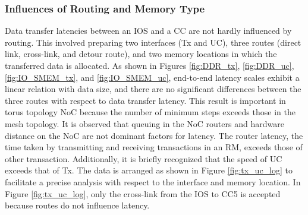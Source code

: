 \documentclass[conference,compsoc]{IEEEtran}
\newcommand{\comment}[1]{}
\begin{document}
\vspace{-3mm}
\subsubsection{Influences of Routing and Memory Type}
\label{sec:routing_and_memory}

\comment{1-20, 1-21}
Data transfer latencies between an IOS and a CC are not hardly influenced by routing.
This involved preparing two interfaces (Tx and UC), three routes (direct link, cross-link, and detour route), and two memory locations in which the transferred data is allocated.
As shown in Figures \ref{fig:DDR_tx}, \ref{fig:DDR_uc}, \ref{fig:IO_SMEM_tx}, and \ref{fig:IO_SMEM_uc}, 
end-to-end latency scales exhibit a linear relation with data size, and there are no significant differences between the three routes with respect to data transfer latency.
This result is important in torus topology NoC because the number of minimum steps exceeds those in the mesh topology. 
It is observed that queuing in the NoC routers and hardware distance on the NoC are not dominant factors for latency.
The router latency, the time taken by transmitting and receiving transactions in an RM, exceeds those of other transaction.
Additionally, it is briefly recognized that the speed of UC exceeds that of Tx.
The data is arranged as shown in Figure \ref{fig:tx_uc_log} to facilitate a precise analysis with respect to the interface and memory location.
In Figure \ref{fig:tx_uc_log}, only the cross-link from the IOS to CC5 is accepted because routes do not influence latency.
\end{document}
